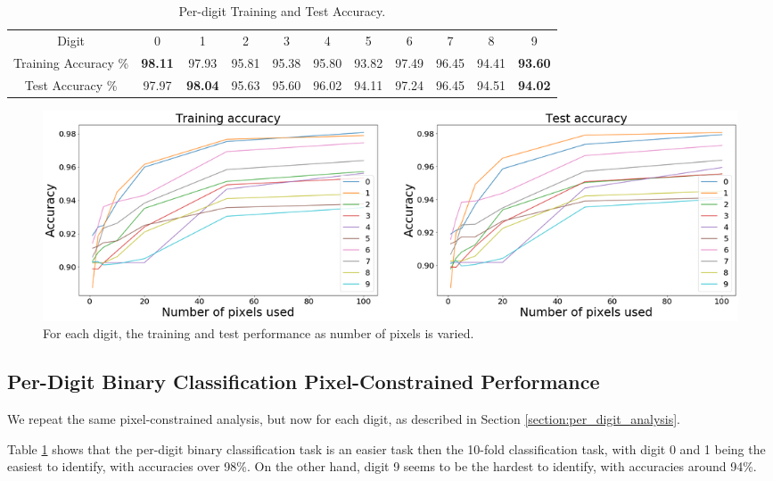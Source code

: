 \documentclass[letterpaper, 10 pt, conference]{ieeeconf}  %
\begin{document}
\begin{table}[t]
\caption{Per-digit Training and Test Accuracy.} %
\centering %
\begin{tabular}{c | c c c c c c c c c c } 
\hline\hline 

Digit & 0 & 1 & 2 & 3 & 4 & 5 & 6 & 7 & 8 & 9 \\
Training Accuracy \% & \textbf{98.11} & 97.93 & 95.81 & 95.38 & 95.80 & 93.82 & 97.49 & 96.45 & 94.41 & \textbf{93.60}  \\
Test Accuracy \% & 97.97 & \textbf{98.04} & 95.63 & 95.60 & 96.02 & 94.11 & 97.24 & 96.45 & 94.51 & \textbf{94.02}  \\

\hline %
\end{tabular}
\label{table:per_digit_retrain_error} %
\end{table}

\begin{figure}[t!] 
\centering
\includegraphics[width=\textwidth]{images/perf_feature_selection_per_digit.png}
\caption{For each digit, the training and test performance as number of pixels is varied.}
\label{fig:perf_feature_selection_per_digit}
\end{figure}

\subsection{Per-Digit Binary Classification Pixel-Constrained Performance}

We repeat the same pixel-constrained analysis, but now for each digit, as described in Section \ref{section:per_digit_analysis}.

Table \ref{table:per_digit_retrain_error} shows that the per-digit binary classification task is an easier task then the 10-fold classification task, with digit 0 and 1 being the easiest to identify, with accuracies over 98\%. On the other hand, digit 9 seems to be the hardest to identify, with accuracies around 94\%.
\end{document}
